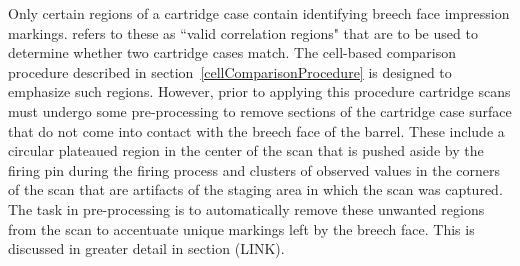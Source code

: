 

Only certain regions of a cartridge case contain identifying breech face impression markings. \citet{song_proposed_2013} refers to these as ``valid correlation regions" that are to be used to determine whether two cartridge cases match. The cell-based comparison procedure described in section~\ref{cellComparisonProcedure} is designed to emphasize such regions. However, prior to applying this procedure cartridge scans must undergo some pre-processing to remove sections of the cartridge case surface that do not come into contact with the breech face of the barrel. These include a circular plateaued region in the center of the scan that is pushed aside by the firing pin during the firing process and clusters of observed values in the corners of the scan that are artifacts of the staging area in which the scan was captured. The task in pre-processing is to automatically remove these unwanted regions from the scan to accentuate unique markings left by the breech face. This is discussed in greater detail in section (LINK).

